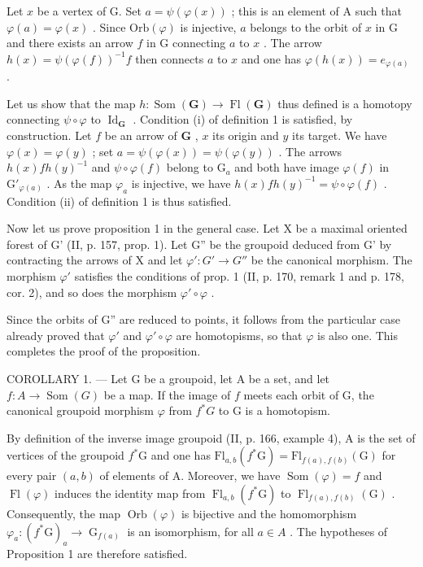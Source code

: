 Let \(x\) be a vertex of G. Set \(a = \psi(\varphi(x))\) ; this is an element of A such that \(\varphi(a) = \varphi(x)\) . Since \(\mathrm{Orb}(\varphi)\) is injective, \(a\) belongs to the orbit of \(x\) in G and there exists an arrow \(f\) in G connecting \(a\) to \(x\) . The arrow \(h(x) = \psi(\varphi(f))^{-1}f\) then connects \(a\) to \(x\) and one has \(\varphi(h(x)) = e_{\varphi(a)}\) .

Let us show that the map \(h \colon \operatorname{Som}(\mathbf{G}) \to \operatorname{Fl}(\mathbf{G})\) thus defined is a homotopy connecting \(\psi \circ \varphi\) to \(\operatorname{Id}_{\mathbf{G}}\) . Condition (i) of definition 1 is satisfied, by construction. Let \(f\) be an arrow of \(\mathbf{G}\) , \(x\) its origin and \(y\) its target. We have \(\varphi(x) = \varphi(y)\) ; set \(a = \psi(\varphi(x)) = \psi(\varphi(y))\) . The arrows \(h(x)fh(y)^{-1}\) and \(\psi \circ \varphi(f)\) belong to \(\mathrm{G}_a\) and both have image \(\varphi(f)\) in \(\mathrm{G}'_{\varphi(a)}\) . As the map \(\varphi_a\) is injective, we have \(h(x)fh(y)^{-1} = \psi \circ \varphi(f)\) . Condition (ii) of definition 1 is thus satisfied.

Now let us prove proposition 1 in the general case. Let X be a maximal oriented forest of G' (II, p. 157, prop. 1). Let G'' be the groupoid deduced from G' by contracting the arrows of X and let \(\varphi'\colon G' \to G''\) be the canonical morphism. The morphism \(\varphi'\) satisfies the conditions of prop. 1 (II, p. 170, remark 1 and p. 178, cor. 2), and so does the morphism \(\varphi'\circ\varphi\) .

Since the orbits of G'' are reduced to points, it follows from the particular case already proved that \(\varphi'\) and \(\varphi'\circ\varphi\) are homotopisms, so that \(\varphi\) is also one. This completes the proof of the proposition.

COROLLARY 1. --- Let G be a groupoid, let A be a set, and let \(f\colon A \to \operatorname{Som}(G)\) be a map. If the image of \(f\) meets each orbit of G, the canonical groupoid morphism \(\varphi\) from \(f^{*}G\) to G is a homotopism.

By definition of the inverse image groupoid (II, p. 166, example 4), A is the set of vertices of the groupoid \(f^{*}\mathrm{G}\) and one has \(\mathrm{Fl}_{a,b}(f^{*}\mathrm{G}) = \mathrm{Fl}_{f(a),f(b)}(\mathrm{G})\) for every pair \((a,b)\) of elements of A. Moreover, we have \(\operatorname{Som}(\varphi) = f\) and \(\operatorname{Fl}(\varphi)\) induces the identity map from \(\operatorname{Fl}_{a,b}(f^{*}\mathrm{G})\) to \(\operatorname{Fl}_{f(a),f(b)}(\mathrm{G})\) . Consequently, the map \(\operatorname{Orb}(\varphi)\) is bijective and the homomorphism \(\varphi_{a}\colon (f^{*}\mathrm{G})_{a} \to \operatorname{G}_{f(a)}\) is an isomorphism, for all \(a \in A\) . The hypotheses of Proposition 1 are therefore satisfied.

